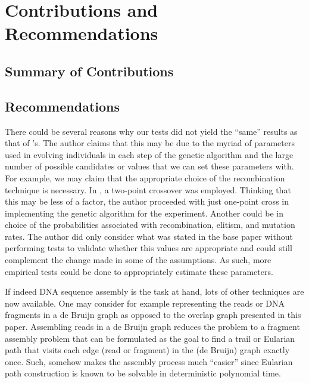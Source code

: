 \chapter{Contributions and Recommendations}

\section{Summary of Contributions}


\section{Recommendations}


There could be several reasons why our tests did not yield the ``same'' results as that of \cite{Zaritsky2004}'s.
The author claims that this may be due to the myriad of parameters used in evolving
individuals in each step of the genetic algorithm and the large number of possible candidates or values that we can set these parameters with. 
For example, we may claim that the appropriate choice of the recombination technique is necessary. In \cite{Zaritsky2004},
a two-point crossover was employed. Thinking that this may be less of a factor, the author proceeded with just
one-point cross in implementing the genetic algorithm for the experiment.
Another could be in choice of the probabilities associated with recombination, elitism, and mutation rates.
The author did only consider what was stated in the base paper without performing tests to validate
whether this values are appropriate and could still complement the change made in some of the assumptions.
As such, more empirical tests could be done to appropriately estimate these parameters. 

If indeed DNA sequence assembly is the task at hand, lots of other techniques are now available.
One may consider for example representing the reads or DNA fragments in a de Bruijn graph
as opposed to the overlap graph presented in this paper. 
Assembling reads  in a de Bruijn graph 
reduces the problem to a fragment assembly problem that can be 
formulated as the goal to find a trail or Eularian path that visits 
each edge (read or fragment) in the (de Bruijn) graph exactly once. 
Such, somehow makes the assembly process much ``easier'' since Eularian path
construction is known to be solvable in deterministic polynomial time.

